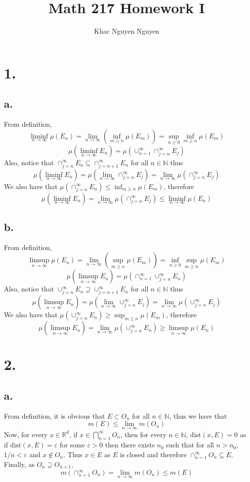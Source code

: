\documentclass[11pt]{article}
\title{\textbf{Math 217 Homework I}}
\author{Khac Nguyen Nguyen}
\date{}
\theoremstyle{mystyle}
\theoremstyle{definition}
\begin{document}
\section*{1.}
\subsection*{a.}
From definition, 
\[
  \liminf_{n\to \infty}\mu(E_n) = \lim_{n\to \infty} (\inf_{m\ge n} \mu(E_m)) = \sup_{n\ge 0} \inf_{m\ge n} \mu(E_m) 
\]
\[
  \mu(\liminf_{n \to \infty} E_n) = \mu(\cup_{n=1}^\infty \cap_{j=n}^\infty E_j)  
\]
Also, notice that $\cap_{j = n}^\infty E_n \subseteq \cap_{j=n+1}^\infty E_n$ for all $n \in \mathbb{N}$ thus 
\[
  \mu(\liminf_{n \to \infty} E_n) = \mu(\lim_{n \to \infty} \cap_{j=n}^\infty E_j) = \lim_{n \to \infty} \mu(\cap_{j=n}^\infty E_j)
\]
We also have that $\mu(\cap_{j=n}^\infty E_n) \le \inf_{m\ge n} \mu(E_m)$, therefore 
\[
  \mu(\liminf_{n \to \infty} E_n) = \lim_{n \to \infty} \mu(\cap_{j=n}^\infty E_j) \le \liminf_{n \to \infty} \mu(E_n) 
\]
\subsection*{b.}
From definition, 
\[
  \limsup_{n\to \infty}\mu(E_n) = \lim_{n\to \infty} (\sup_{m\ge n} \mu(E_m)) = \inf_{n\ge 0} \sup_{m\ge n} \mu(E_m) 
\]
\[
  \mu(\limsup_{n \to \infty} E_n) = \mu(\cap_{n=1}^\infty \cup_{j=n}^\infty E_n)  
\]
Also, notice that $\cup_{j = n}^\infty E_n \supseteq \cup_{j=n+1}^\infty E_n$ for all $n \in \mathbb{N}$ thus 
\[
  \mu(\limsup_{n \to \infty} E_n) = \mu(\lim_{n \to \infty} \cup_{j=n}^\infty E_j) = \lim_{n \to \infty} \mu(\cup_{j=n}^\infty E_j)
\]
We also have that $\mu(\cup_{j=n}^\infty E_n) \ge \sup_{m\ge n} \mu(E_m)$, therefore 
\[
  \mu(\limsup_{n \to \infty} E_n) = \lim_{n \to \infty} \mu(\cup_{j=n}^\infty E_n) \ge \limsup_{n \to \infty} \mu(E_n) 
\]
\newpage
\section*{2.}
\subsection*{a.}
From definition, it is obvious that $E \subset O_n$ for all $n \in \mathbb{N}$, thus we have that 
\[
  m(E) \le \lim_{n \to \infty} m(O_n)
\]
Now, for every $x \in \mathbb{R}^d$, if $x \in \bigcap_{n=1}^\infty O_n$, then for every $n \in \mathbb{N}$, $\text{dist}(x,E) = 0$ as if $\text{dist}(x,E) = \varepsilon$ for some $\varepsilon >0$ then there exists $n_0$ such that for all $n>n_0$, $1/n < \varepsilon$ and $x \notin O_{n}$. Thus $x \in E$ as $E$ is closed and therefore $\cap_{n=1}^\infty O_n \subseteq E$. Finally, as $O_n \supseteq O_{n+1}$,
\[
  m(\cap_{n=1}^\infty O_n) = \lim_{n \to \infty} m(O_n) \le m(E)
\]
\end{document}
